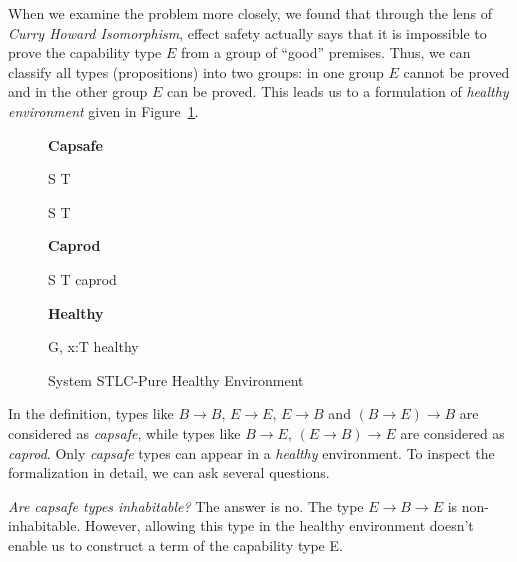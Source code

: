When we examine the problem more closely, we found that through the
lens of \emph{Curry Howard Isomorphism}, effect safety actually says
that it is impossible to prove the capability type $E$ from a group of
``good'' premises. Thus, we can classify all types (propositions) into
two groups: in one group $E$ cannot be proved and in the other group
$E$ can be proved. This leads us to a formulation of \emph{healthy
  environment} given in Figure~\ref{fig:stlc-pure-healthy-definition}.

\begin{figure}[h]
\begin{framed}

\setlength{\columnseprule}{0.4pt}
\begin{multicols}{2}

\textbf{Capsafe}


{ S \to T \quad {} }

{ S \to T \quad {} }

\columnbreak

\textbf{Caprod}


{ S \to T \quad caprod }

\textbf{Healthy}


{ G, \; x:T \quad healthy }


\end{multicols}
\end{framed}

\caption{System STLC-Pure Healthy Environment}
\label{fig:stlc-pure-healthy-definition}
\end{figure}

In the definition, types like $B \to B$, $E \to E$, $E \to B$ and
$(B \to E) \to B$ are considered as \emph{capsafe}, while types like
$B \to E$, $(E \to B) \to E$ are considered as \emph{caprod}. Only
\emph{capsafe} types can appear in a \emph{healthy} environment. To
inspect the formalization in detail, we can ask several questions.

\emph{Are capsafe types inhabitable?} The answer is no. The type
$E \to B \to E$ is non-inhabitable. However, allowing this type in the
healthy environment doesn't enable us to construct a term of the
capability type E.

